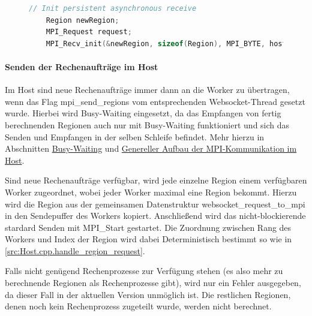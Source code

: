 \begin{figure}[h!]
	
\end{figure}

\begin{figure}[h!]
	\begin{lstlisting}[language=c++, caption={Initialisierung des Persistent Communication Requests im Worker}, label={src:mpi_recv_init_worker}, firstnumber=56]
	// Init persistent asynchronous receive
	Region newRegion;
	MPI_Request request;
	MPI_Recv_init(&newRegion, sizeof(Region), MPI_BYTE, host_rank, 1, MPI_COMM_WORLD, &request);
	\end{lstlisting}
\end{figure}

\paragraph{Senden der Rechenaufträge im Host}\label{para:send_host}

Im Host sind neue Rechenaufträge immer dann an die Worker zu übertragen, wenn das Flag mpi\_send\_regions vom entsprechenden Websocket-Thread gesetzt wurde. Hierbei wird Busy-Waiting eingesetzt, da das Empfangen von fertig berechnenden Regionen auch nur mit Busy-Waiting funktioniert und sich das Senden und Empfangen in der selben Schleife befindet. Mehr hierzu in Abschnitten \hyperref[para:mpi_busy_waiting]{Busy-Waiting} und \hyperref[para:mpi_generell_host]{Genereller Aufbau der MPI-Kommunikation im Host}.

Sind neue Rechenaufträge verfügbar, wird jede einzelne Region einem verfügbaren Worker zugeordnet, wobei jeder Worker maximal eine Region bekommt.
Hierzu wird die Region aus der gemeinsamen Datenstruktur websocket\_request\_to\_mpi in den Sendepuffer des Workers kopiert. Anschließend wird das nicht-blockierende stardard Senden mit MPI\_Start gestartet.
Die Zuordnung zwischen Rang des Workers und Index der Region wird dabei Deterministisch bestimmt so wie in \autoref{src:Host.cpp.handle_region_request}.


Falls nicht genügend Rechenprozesse zur Verfügung stehen (es also mehr zu berechnende Regionen als Rechenprozesse gibt), wird nur ein Fehler ausgegeben, da dieser Fall in der aktuellen Version unmöglich ist. Die restlichen Regionen, denen noch kein Rechenprozess zugeteilt wurde, werden nicht berechnet.

